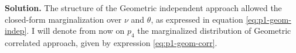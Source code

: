 \vspace{2ex}

    {\bf Solution.} The structure of the Geometric independent approach
    allowed the closed-form marginalization over $\nu$ and $\theta$, as expressed in
    equation \ref{eq:p1-geom-indep}. I will denote from now on $p_4$ the
    marginalized distribution of Geometric correlated approach, given by
    expression \ref{eq:p1-geom-corr}.
